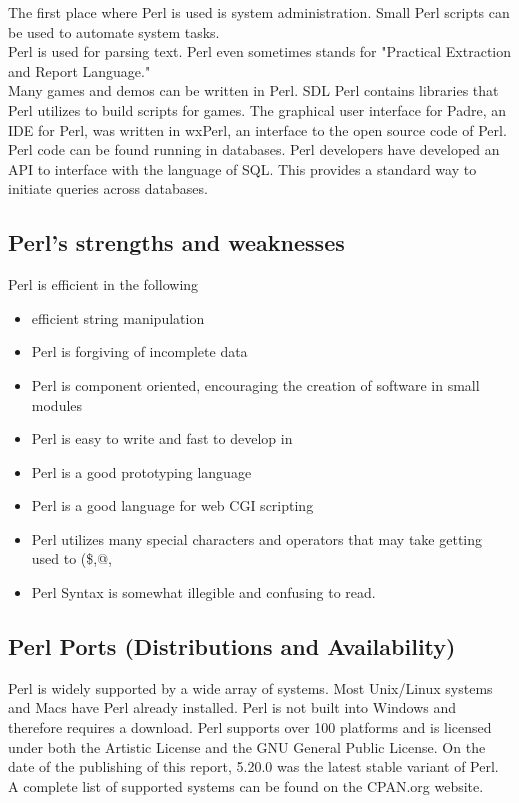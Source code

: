 \documentclass[11pt,a4paper]{article}
\begin{document}
\noindent The first place where Perl is used is system administration. Small Perl scripts can be used to automate system tasks.\\

\noindent Perl is used for parsing text. Perl even sometimes stands for "Practical Extraction and Report Language."\\

\noindent Many games and demos can be written in Perl. SDL Perl contains libraries that Perl utilizes to build scripts for games. The graphical user interface for Padre, an IDE for Perl, was written in wxPerl, an interface to the open source code of Perl.\\ 

\noindent Perl code can be found running in databases. Perl developers have developed an API to interface with the language of SQL. This provides a standard way to initiate queries across databases. \\

\subsection{Perl's strengths and weaknesses}
\cite{05} 
Perl is efficient in the following \begin{itemize}
\item efficient string manipulation
\item Perl is forgiving of incomplete data
\item Perl is component oriented, encouraging the creation of software in small modules
\item Perl is easy to write and fast to develop in
\item Perl is a good prototyping language
\item Perl is a good language for web CGI scripting
\item Perl utilizes many special characters and operators that may take getting used to (\$,@,%
\item Perl Syntax is somewhat illegible and confusing to read\cite{18}. 
\end{itemize}
\subsection{Perl Ports (Distributions and Availability)}
Perl is widely supported by a wide array of systems. Most Unix/Linux systems and Macs have Perl already installed\cite{06}. Perl is not built into Windows and therefore requires a download. Perl supports over 100 platforms and is licensed under both the Artistic License and the GNU General Public License.  On the date of the publishing of this report, 5.20.0 was the latest stable variant of Perl. A complete list of supported systems can be found on the CPAN.org website.\\
\end{document}
